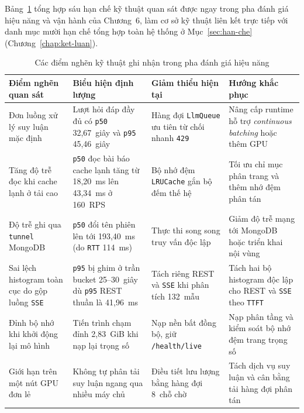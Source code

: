 Bảng~\ref{tab:diem-nghen-ky-thuat-ch6} tổng hợp sáu hạn chế kỹ thuật quan sát được ngay trong pha đánh giá hiệu năng và vận hành của Chương~6, làm cơ sở kỹ thuật liên kết trực tiếp với danh mục mười hạn chế tổng hợp toàn hệ thống ở Mục~\ref{sec:han-che} (Chương~\ref{chap:ket-luan}).

\begin{table}[htbp]
\centering
\caption{Các điểm nghẽn kỹ thuật ghi nhận trong pha đánh giá hiệu năng}
\label{tab:diem-nghen-ky-thuat-ch6}
\footnotesize
\setlength{\tabcolsep}{4pt}
\begin{tabularx}{\textwidth}{
  >{\raggedright\arraybackslash}p{3.1cm}
  >{\raggedright\arraybackslash}p{4.2cm}
  >{\raggedright\arraybackslash}p{3.5cm}
  >{\raggedright\arraybackslash}X
}
\toprule
\textbf{Điểm nghẽn quan sát} & \textbf{Biểu hiện định lượng} & \textbf{Giảm thiểu hiện tại} & \textbf{Hướng khắc phục} \\
\midrule
Đơn luồng xử lý suy luận mặc định & Lượt hỏi đáp đầy đủ có \texttt{p50} 32,67~giây và \texttt{p95} 45,46~giây & Hàng đợi \texttt{LlmQueue} ưu tiên từ chối nhanh \texttt{429} & Nâng cấp runtime hỗ trợ \textit{continuous batching} hoặc thêm GPU \\
\midrule
Tăng độ trễ đọc khi cache lạnh ở tải cao & \texttt{p50} đọc bài báo cache lạnh tăng từ 18,20~ms lên 43,34~ms ở 160~RPS & Bộ nhớ đệm \texttt{LRUCache} gắn bộ đếm thế hệ & Tối ưu chỉ mục phân trang và thêm nhớ đệm phân tán \\
\midrule
Độ trễ ghi qua \texttt{tunnel} MongoDB & \texttt{p50} đổi tên phiên lên tới 193,40~ms (do \texttt{RTT} 114~ms) & Thực thi song song truy vấn độc lập & Giảm độ trễ mạng tới MongoDB hoặc triển khai nội vùng \\
\midrule
Sai lệch histogram toàn cục do gộp luồng \texttt{SSE} & \texttt{p95} bị ghim ở trần bucket 25--30~giây dù \texttt{p95} REST thuần là 41,96~ms & Tách riêng REST và \texttt{SSE} khi phân tích 132~mẫu & Tách hai bộ histogram độc lập cho REST và \texttt{SSE} theo \texttt{TTFT} \\
\midrule
Đỉnh bộ nhớ khi khởi động lại mô hình & Tiến trình chạm đỉnh 2,83~GiB khi nạp lại trọng số & Nạp nền bất đồng bộ, giữ \texttt{/health/live} & Nạp phân tầng và kiểm soát bộ nhớ đệm trang trọng số \\
\midrule
Giới hạn trên một nút GPU đơn lẻ & Không tự phân tải suy luận ngang qua nhiều máy chủ & Điều tiết lưu lượng bằng hàng đợi 8~chỗ chờ & Tách dịch vụ suy luận và cân bằng tải hàng đợi phân tán \\
\bottomrule
\end{tabularx}
\end{table}

